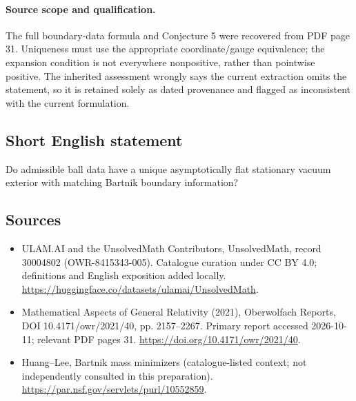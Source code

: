\documentclass[11pt]{article}
\begin{document}
\paragraph{Source scope and qualification.}
The full boundary-data formula and Conjecture 5 were recovered from PDF page 31. Uniqueness must use the appropriate coordinate/gauge equivalence; the expansion condition is not everywhere nonpositive, rather than pointwise positive. The inherited assessment wrongly says the current extraction omits the statement, so it is retained solely as dated provenance and flagged as inconsistent with the current formulation.
\subsection{Short English statement}
Do admissible ball data have a unique asymptotically flat stationary vacuum exterior with matching Bartnik boundary information?
\subsection{Sources}
\begin{itemize}
\item[\hypertarget{source:30004802:1}{S1}] ULAM.AI and the UnsolvedMath Contributors, UnsolvedMath, record 30004802 (OWR-8415343-005). Catalogue curation under CC BY 4.0; definitions and English exposition added locally.
\url{https://huggingface.co/datasets/ulamai/UnsolvedMath}.
\item[\hypertarget{source:30004802:2}{S2}] Mathematical Aspects of General Relativity (2021), Oberwolfach Reports, DOI 10.4171/owr/2021/40, pp. 2157--2267. Primary report accessed 2026-10-11; relevant PDF pages 31.
\url{https://doi.org/10.4171/owr/2021/40}.
\item[\hypertarget{source:30004802:3}{S3}] Huang--Lee, Bartnik mass minimizers (catalogue-listed context; not independently consulted in this preparation).
\url{https://par.nsf.gov/servlets/purl/10552859}.
\end{itemize}
\label{end:30004802}
\end{document}

